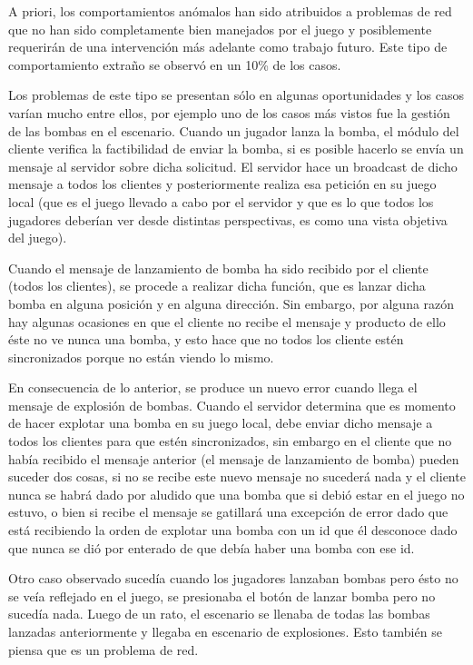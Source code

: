 \documentclass[a4paper,12pt,openany,oneside]{book}
\begin{document}
A priori, los comportamientos anómalos han sido atribuidos a problemas de red que no han sido completamente bien manejados por el juego y posiblemente requerirán de una intervención más adelante como trabajo futuro. Este tipo de comportamiento extraño se observó en un 10\% de los casos.

Los problemas de este tipo se presentan sólo en algunas oportunidades y los casos varían mucho entre ellos, por ejemplo uno de los casos más vistos fue la gestión de las bombas en el escenario. Cuando un jugador lanza la bomba, el módulo del cliente verifica la factibilidad de enviar la bomba, si es posible hacerlo se envía un mensaje al servidor sobre dicha solicitud. El servidor hace un broadcast de dicho mensaje a todos los clientes y posteriormente realiza esa petición en su juego local (que es el juego llevado a cabo por el servidor y que es lo que todos los jugadores deberían ver desde distintas perspectivas, es como una vista objetiva del juego).

Cuando el mensaje de lanzamiento de bomba ha sido recibido por el cliente (todos los clientes), se procede a realizar dicha función, que es lanzar dicha bomba en alguna posición y en alguna dirección. Sin embargo, por alguna razón hay algunas ocasiones en que el cliente no recibe el mensaje y producto de ello éste no ve nunca una bomba, y esto hace que no todos los cliente estén sincronizados porque no están viendo lo mismo.

En consecuencia de lo anterior, se produce un nuevo error cuando llega el mensaje de explosión de bombas. Cuando el servidor determina que es momento de hacer explotar una bomba en su juego local, debe enviar dicho mensaje a todos los clientes para que estén sincronizados, sin embargo en el cliente que no había recibido el mensaje anterior (el mensaje de lanzamiento de bomba) pueden suceder dos cosas, si no se recibe este nuevo mensaje no sucederá nada y el cliente nunca se habrá dado por aludido que una bomba que si debió estar en el juego no estuvo, o bien si recibe el mensaje se gatillará una excepción de error dado que está recibiendo la orden de explotar una bomba con un id que él desconoce dado que nunca se dió por enterado de que debía haber una bomba con ese id.

Otro caso observado sucedía cuando los jugadores lanzaban bombas pero ésto no se veía reflejado en el juego, se presionaba el botón de lanzar bomba pero no sucedía nada. Luego de un rato, el escenario se llenaba de todas las bombas lanzadas anteriormente y llegaba en escenario de explosiones. Esto también se piensa que es un problema de red.
\end{document}
